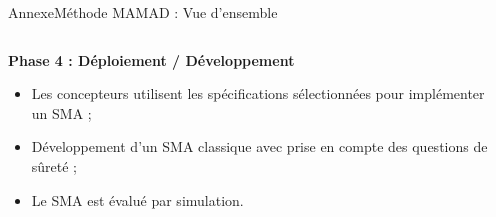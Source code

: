 \begin{frame}{Annexe}{Méthode MAMAD : Vue d’ensemble}

    \begin{columns}

        \begin{column}{0.6\textwidth}

            \textbf{Phase 4 : Déploiement / Développement}

            \begin{itemize}
                \item Les concepteurs utilisent les spécifications sélectionnées pour implémenter un SMA ;
                \item Développement d’un SMA classique avec prise en compte des questions de sûreté ;
                \item Le SMA est évalué par simulation.
            \end{itemize}

        \end{column}

        \begin{column}{0.4\textwidth}
            \centering
        \end{column}


\end{columns}
\end{frame}
